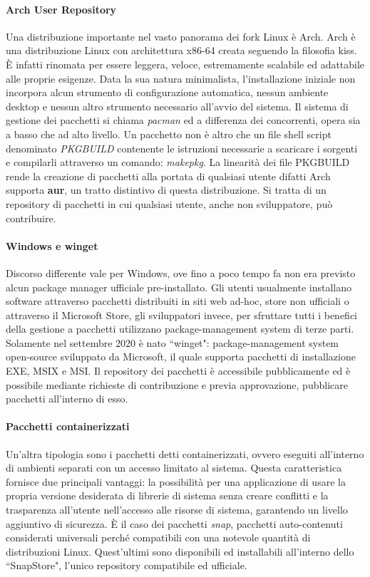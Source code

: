 \paragraph{Arch User Repository} Una distribuzione importante nel vasto panorama dei fork Linux è Arch. Arch è una distribuzione Linux con architettura x86-64 creata seguendo la filosofia \ac{kiss}. È infatti rinomata per essere leggera, veloce, estremamente scalabile ed adattabile alle proprie esigenze. Data la sua natura minimalista, l'installazione iniziale non incorpora alcun strumento di configurazione automatica, nessun ambiente desktop e nessun altro strumento necessario all'avvio del sistema. Il sistema di gestione dei pacchetti si chiama \textit{pacman} ed a differenza dei concorrenti, opera sia a basso che ad alto livello. Un pacchetto non è altro che un file shell script denominato \textit{PKGBUILD} contenente le istruzioni necessarie a scaricare i sorgenti e compilarli attraverso un comando: \textit{makepkg}. La linearità dei file PKGBUILD rende la creazione di pacchetti alla portata di qualsiasi utente difatti Arch supporta \textbf{\ac{aur}}, un tratto distintivo di questa distribuzione. Si tratta di un repository di pacchetti in cui qualsiasi utente, anche non sviluppatore, può contribuire.  

\paragraph{Windows e winget} Discorso differente vale per Windows, ove fino a poco tempo fa non era previsto alcun package manager ufficiale pre-installato. Gli utenti usualmente installano software attraverso pacchetti distribuiti in siti web ad-hoc, store non ufficiali o attraverso il Microsoft Store, gli sviluppatori invece, per sfruttare tutti i benefici della gestione a pacchetti utilizzano package-management system di terze parti. Solamente nel settembre 2020 è nato ``winget": package-management system open-source sviluppato da Microsoft, il quale supporta pacchetti di installazione EXE, MSIX e MSI. Il repository dei pacchetti è accessibile pubblicamente ed è possibile mediante richieste di contribuzione e previa approvazione, pubblicare pacchetti all'interno di esso.

\paragraph{Pacchetti containerizzati} Un'altra tipologia sono i pacchetti detti containerizzati, ovvero eseguiti all'interno di ambienti separati con un accesso limitato al sistema. Questa caratteristica fornisce due principali vantaggi: la possibilità per una applicazione di usare la propria versione desiderata di librerie di sistema senza creare conflitti e la trasparenza all'utente nell'accesso alle risorse di sistema, garantendo un livello aggiuntivo di sicurezza. È il caso dei pacchetti \textit{snap}, pacchetti auto-contenuti considerati universali perché compatibili con una notevole quantità di distribuzioni Linux. Quest'ultimi sono disponibili ed installabili all'interno dello ``SnapStore", l'unico repository compatibile ed ufficiale.

